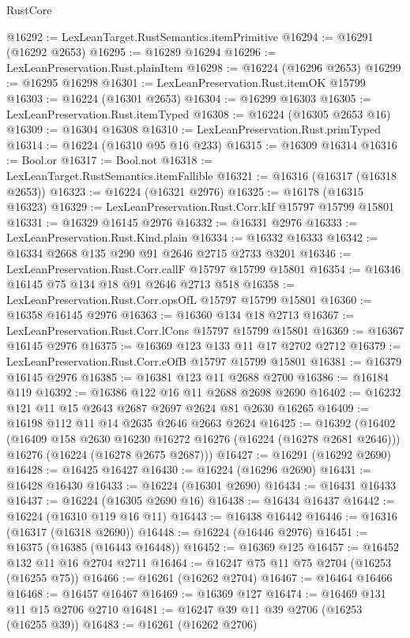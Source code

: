 \begin{lexlean}{RustCore}
\begin{coremodule}
@16292 := LexLeanTarget.RustSemantics.itemPrimitive
@16294 := @16291 (@16292 @2653)
@16295 := @16289 @16294
@16296 := LexLeanPreservation.Rust.plainItem
@16298 := @16224 (@16296 @2653)
@16299 := @16295 @16298
@16301 := LexLeanPreservation.Rust.itemOK @15799
@16303 := @16224 (@16301 @2653)
@16304 := @16299 @16303
@16305 := LexLeanPreservation.Rust.itemTyped
@16308 := @16224 (@16305 @2653 @16)
@16309 := @16304 @16308
@16310 := LexLeanPreservation.Rust.primTyped
@16314 := @16224 (@16310 @95 @16 @233)
@16315 := @16309 @16314
@16316 := Bool.or
@16317 := Bool.not
@16318 := LexLeanTarget.RustSemantics.itemFallible
@16321 := @16316 (@16317 (@16318 @2653))
@16323 := @16224 (@16321 @2976)
@16325 := @16178 (@16315 @16323)
@16329 := LexLeanPreservation.Rust.Corr.kIf @15797 @15799 @15801
@16331 := @16329 @16145 @2976
@16332 := @16331 @2976
@16333 := LexLeanPreservation.Rust.Kind.plain
@16334 := @16332 @16333
@16342 := @16334 @2668 @135 @290 @91 @2646 @2715 @2733 @3201
@16346 := LexLeanPreservation.Rust.Corr.callF @15797 @15799 @15801
@16354 := @16346 @16145 @75 @134 @18 @91 @2646 @2713 @518
@16358 := LexLeanPreservation.Rust.Corr.opsOfL @15797 @15799 @15801
@16360 := @16358 @16145 @2976
@16363 := @16360 @134 @18 @2713
@16367 := LexLeanPreservation.Rust.Corr.lCons @15797 @15799 @15801
@16369 := @16367 @16145 @2976
@16375 := @16369 @123 @133 @11 @17 @2702 @2712
@16379 := LexLeanPreservation.Rust.Corr.eOfB @15797 @15799 @15801
@16381 := @16379 @16145 @2976
@16385 := @16381 @123 @11 @2688 @2700
@16386 := @16184 @119
@16392 := @16386 @122 @16 @11 @2688 @2698 @2690
@16402 := @16232 @121 @11 @15 @2643 @2687 @2697 @2624 @81 @2630 @16265
@16409 := @16198 @112 @11 @14 @2635 @2646 @2663 @2624
@16425 := @16392
    (@16402
      (@16409 @158 @2630 @16230 @16272 @16276 (@16224 (@16278 @2681 @2646)))
      @16276
      (@16224 (@16278 @2675 @2687)))
@16427 := @16291 (@16292 @2690)
@16428 := @16425 @16427
@16430 := @16224 (@16296 @2690)
@16431 := @16428 @16430
@16433 := @16224 (@16301 @2690)
@16434 := @16431 @16433
@16437 := @16224 (@16305 @2690 @16)
@16438 := @16434 @16437
@16442 := @16224 (@16310 @119 @16 @11)
@16443 := @16438 @16442
@16446 := @16316 (@16317 (@16318 @2690))
@16448 := @16224 (@16446 @2976)
@16451 := @16375 (@16385 (@16443 @16448))
@16452 := @16369 @125
@16457 := @16452 @132 @11 @16 @2704 @2711
@16464 := @16247 @75 @11 @75 @2704 (@16253 (@16255 @75))
@16466 := @16261 (@16262 @2704)
@16467 := @16464 @16466
@16468 := @16457 @16467
@16469 := @16369 @127
@16474 := @16469 @131 @11 @15 @2706 @2710
@16481 := @16247 @39 @11 @39 @2706 (@16253 (@16255 @39))
@16483 := @16261 (@16262 @2706)

\end{coremodule}
\end{lexlean}
